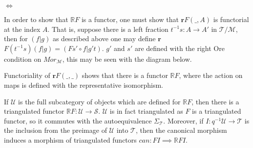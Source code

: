         \begin{center}
             $\iff$
        \end{center}

        In order to show that $\mathbb{R}F$ is a functor, one must show that $\textbf{r}$$F(\_,A)$ is functorial at the index $A$. That is, suppose there is a left fraction $t^{-1}s:A\rightarrow A'$ in $\mathcal{T}/\mathcal{M}$, then for $(f|g)$ as described above one may define $\textbf{r}$$F(t^{-1}s)(f|g)=(Fs'\circ f|g't)$. $g'$ and $s'$ are defined with the right Ore condition on $Mor_{\mathcal{M}}$, this may be seen with the diagram below.

        \begin{center}
        \end{center}

        Functoriality of $\textbf{r}$$F(\_,\_)$ shows that there is a functor $\mathbb{R}F$, where the action on maps is defined with the representative isomorphism.
        
        \begin{center}
        \end{center}
        
        If $\mathcal{U}$ is the full subcategory of objects which are defined for $\mathbb{R}F$, then there is a triangulated functor $\mathbb{R}F:\mathcal{U}\rightarrow \mathcal{S}$. $\mathcal{U}$ is in fact triangulated as $F$ is a triangulated functor, so it commutes with the autoequivalence $\Sigma_{\mathcal{T}}$. Moreover, if $I:q^{-1}\mathcal{U}\rightarrow \mathcal{T}$ is the inclusion from the preimage of $\mathcal{U}$ into $\mathcal{T}$, then the canonical morphism induces a morphism of triangulated functors $can:FI\implies\mathbb{R}FI$. \\

